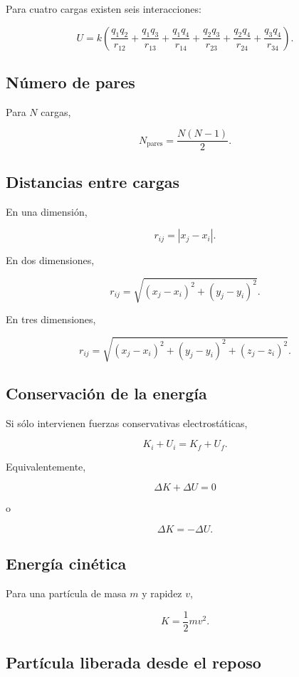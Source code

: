 Para cuatro cargas existen seis interacciones:

\[
\boxed{
U
=
k
\left(
\frac{q_1q_2}{r_{12}}
+
\frac{q_1q_3}{r_{13}}
+
\frac{q_1q_4}{r_{14}}
+
\frac{q_2q_3}{r_{23}}
+
\frac{q_2q_4}{r_{24}}
+
\frac{q_3q_4}{r_{34}}
\right)
}.
\]


\subsection{Número de pares}

Para \(N\) cargas,

\[
\boxed{
N_{\text{pares}}
=
\frac{N(N-1)}{2}
}.
\]


\subsection{Distancias entre cargas}

En una dimensión,

\[
\boxed{
r_{ij}=|x_j-x_i|
}.
\]

En dos dimensiones,

\[
\boxed{
r_{ij}
=
\sqrt{
(x_j-x_i)^2+
(y_j-y_i)^2
}
}.
\]

En tres dimensiones,

\[
\boxed{
r_{ij}
=
\sqrt{
(x_j-x_i)^2+
(y_j-y_i)^2+
(z_j-z_i)^2
}
}.
\]


\subsection{Conservación de la energía}

Si sólo intervienen fuerzas conservativas electrostáticas,

\[
\boxed{
K_i+U_i=K_f+U_f
}.
\]

Equivalentemente,

\[
\boxed{
\Delta K+\Delta U=0
}
\]

o

\[
\boxed{
\Delta K=-\Delta U
}.
\]


\subsection{Energía cinética}

Para una partícula de masa \(m\) y rapidez \(v\),

\[
\boxed{
K=\frac12mv^2
}.
\]


\subsection{Partícula liberada desde el reposo}

